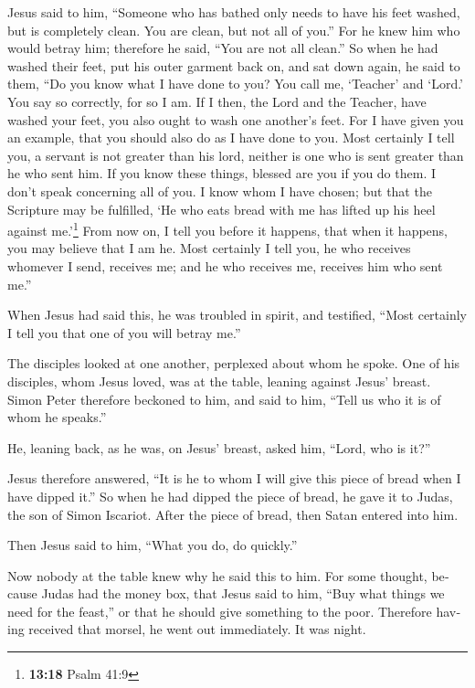 \begin{paracol}{2}
\begin{otherlanguage}{english}
 Jesus said to him, ``Someone who has bathed only needs
to have his feet washed, but is completely clean. You are clean, but not
all of you.''  For he knew him who would betray him;
therefore he said, ``You are not all clean.''  So when he
had washed their feet, put his outer garment back on, and sat down
again, he said to them, ``Do you know what I have done to you?
 You call me, `Teacher' and `Lord.' You say so correctly,
for so I am.  If I then, the Lord and the Teacher, have
washed your feet, you also ought to wash one another's feet.
 For I have given you an example, that you should also do
as I have done to you.  Most certainly I tell you, a
servant is not greater than his lord, neither is one who is sent greater
than he who sent him.  If you know these things, blessed
are you if you do them.  I don't speak concerning all of
you. I know whom I have chosen; but that the Scripture may be fulfilled,
`He who eats bread with me has lifted up his heel against
me.'\footnote{\textbf{13:18} Psalm 41:9}  From now on, I
tell you before it happens, that when it happens, you may believe that I
am he.  Most certainly I tell you, he who receives
whomever I send, receives me; and he who receives me, receives him who
sent me.''

 When Jesus had said this, he was troubled in spirit, and
testified, ``Most certainly I tell you that one of you will betray me.''

 The disciples looked at one another, perplexed about
whom he spoke.  One of his disciples, whom Jesus loved,
was at the table, leaning against Jesus' breast.  Simon
Peter therefore beckoned to him, and said to him, ``Tell us who it is of
whom he speaks.''

 He, leaning back, as he was, on Jesus' breast, asked
him, ``Lord, who is it?''

 Jesus therefore answered, ``It is he to whom I will give
this piece of bread when I have dipped it.'' So when he had dipped the
piece of bread, he gave it to Judas, the son of Simon Iscariot.
 After the piece of bread, then Satan entered into him.

Then Jesus said to him, ``What you do, do quickly.''

 Now nobody at the table knew why he said this to him.
 For some thought, because Judas had the money box, that
Jesus said to him, ``Buy what things we need for the feast,'' or that he
should give something to the poor.  Therefore having
received that morsel, he went out immediately. It was night.


\end{otherlanguage}
\end{paracol}
